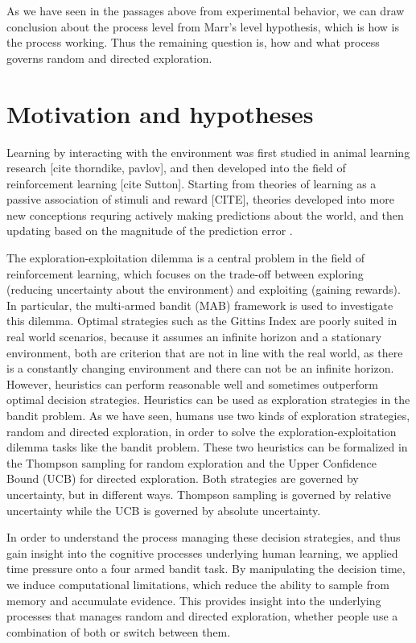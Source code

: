 As we have seen in the passages above from experimental behavior, we can draw conclusion about the process level from Marr's level hypothesis, which is how is the process working. Thus the remaining question is, how and what process governs random and directed exploration. 

\section{Motivation and hypotheses}
Learning by interacting with the environment was first studied in animal learning research [cite thorndike, pavlov], and then developed into the field of reinforcement learning [cite Sutton]. Starting from theories of learning as a passive association of stimuli and reward [CITE], theories developed into more new conceptions requring actively making predictions about the world, and then updating based on the magnitude of the prediction error \citep{rescorla1972theory}. 

The exploration-exploitation dilemma is a central problem in the field of reinforcement learning, which focuses on the trade-off between exploring (reducing uncertainty about the environment) and exploiting (gaining rewards). In particular, the multi-armed bandit (MAB) framework is used to investigate this dilemma. Optimal strategies such as the Gittins Index are poorly suited in real world scenarios, because it assumes an infinite horizon and a stationary environment, both are criterion that are not in line with the real world, as there is a constantly changing environment and there can not be an infinite horizon. %
However, heuristics can perform reasonable well and sometimes outperform optimal decision strategies. Heuristics can be used as exploration strategies in the bandit problem. %
As we have seen, humans use two kinds of exploration strategies, random and directed exploration, in order to solve the exploration-exploitation dilemma tasks like the bandit problem. %
These two heuristics can be formalized in the Thompson sampling for random exploration and the Upper Confidence Bound (UCB) for directed exploration. Both strategies are governed by uncertainty, but in different ways. Thompson sampling is governed by relative uncertainty while the UCB is governed by absolute uncertainty.

In order to understand the process managing these decision strategies, and thus gain insight into the cognitive processes underlying human learning, we applied time pressure onto a four armed bandit task. 
By manipulating the decision time, we induce computational limitations, which reduce the ability to sample from memory and accumulate evidence. This provides insight into the underlying processes that manages random and directed exploration, whether people use a combination of both or switch between them. 

\newpage




%